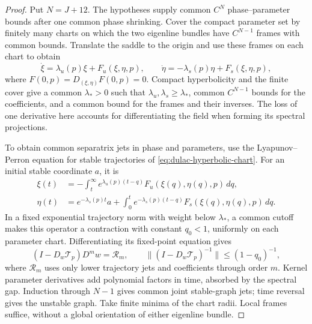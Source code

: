 \begin{proof}
Put $N=J+12$. The hypotheses supply common $C^N$ phase--parameter bounds
after one common phase shrinking. Cover the compact
parameter set by finitely many charts on which the two eigenline bundles
have $C^{N-1}$ frames with common bounds. Translate the saddle to the
origin and use these frames on each chart to obtain
\begin{equation}\label{eq:dulac-hyperbolic-chart}
 \dot\xi=\lambda_u(p)\xi+F_u(\xi,\eta,p),\qquad
 \dot\eta=-\lambda_s(p)\eta+F_s(\xi,\eta,p),
\end{equation}
where $F(0,p)=D_{(\xi,\eta)}F(0,p)=0$.  Compact hyperbolicity and the
finite cover give a common $\lambda_*>0$ such that
$\lambda_u,\lambda_s\ge\lambda_*$, common $C^{N-1}$ bounds for the
coefficients, and a common bound for the frames and their inverses.  The
loss of one derivative here accounts for differentiating the field when
forming its spectral projections.

To obtain common separatrix jets in phase and parameters, use the
Lyapunov--Perron equation for stable trajectories of
\eqref{eq:dulac-hyperbolic-chart}. For an initial stable coordinate $a$,
it is
\begin{equation}\label{eq:dulac-lyapunov-perron}
 \begin{aligned}
  \xi(t)&=-\int_t^\infty e^{\lambda_u(p)(t-q)}
                  F_u(\xi(q),\eta(q),p)\,dq,\\
  \eta(t)&=e^{-\lambda_s(p)t}a
       +\int_0^t e^{-\lambda_s(p)(t-q)}
                  F_s(\xi(q),\eta(q),p)\,dq .
 \end{aligned}
\end{equation}
In a fixed exponential trajectory norm with weight below $\lambda_*$,
a common cutoff makes this operator a contraction with constant
$q_0<1$, uniformly on each parameter chart. Differentiating its
fixed-point equation gives
\[
 (I-D_w\mathcal T_p)D^m w=\mathcal R_m,\qquad
 \|(I-D_w\mathcal T_p)^{-1}\|\le(1-q_0)^{-1},
\]
where $\mathcal R_m$ uses only lower trajectory jets and coefficients
through order $m$. Kernel parameter derivatives add polynomial factors
in time, absorbed by the spectral gap. Induction through $N-1$ gives
common joint stable-graph jets; time reversal gives the unstable graph.
Take finite minima of the chart radii. Local frames suffice, without
a global orientation of either eigenline bundle.


\end{proof}
